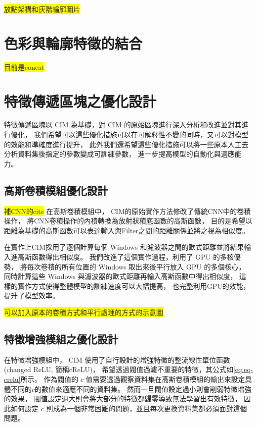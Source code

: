 \documentclass[class=NCU_thesis, crop=false]{standalone}
\begin{document}
\colorbox {yellow}{放點架構和灰階輪廓圖片}

\section{色彩與輪廓特徵的結合}
\colorbox {yellow}{目前是concat}

\section{特徵傳遞區塊之優化設計}
特徵傳遞區塊以 CIM 為基礎，對 CIM 的原始區塊進行深入分析和改進並對其進行優化，
我們希望可以這些優化措施可以在可解釋性不變的同時，又可以對模型的效能和準確度進行提升，
此外我們還希望這些優化措施可以將一些原本人工去分析資料集後指定的參數變成可訓練參數，
進一步提高模型的自動化與適應能力。

	\subsection{高斯卷積模組優化設計}

	\colorbox {yellow}{補CNN的cite}
	在高斯卷積模組中，
	CIM的原始實作方法修改了傳統CNN\cite{}中的卷積操作，
	將CNN卷積操作的內積轉換為放射狀積底函數的高斯函數，
	目的是希望以距離為基礎的高斯函數可以表達輸入與Filter之間的距離關係並將之視為相似度。

	在實作上CIM採用了逐個計算每個 Windows 和濾波器之間的歐式距離並將結果輸入進高斯函數得出相似度。
	我們改進了這個實作過程，利用了 GPU 的多核優勢，
	將每次卷積的所有位置的 Windows 取出來後平行放入 GPU 的多個核心，
	同時計算這些 Windows 與濾波器的歐式距離再輸入高斯函數中得出相似度，
	這樣的實作方式使得整體模型的訓練速度可以大幅提高，
	也完整利用GPU的效能，提升了模型效率。

	\colorbox {yellow}{可以加入原本的卷積方式和平行處理的方式的示意圖}

	\subsection{特徵增強模組之優化設計}
	在特徵增強模組中，
	CIM 使用了自行設計的增強特徵的整流線性單位函數(changed ReLU, 簡稱cReLU)，
	希望透過閥值過濾不重要的特徵，其公式如\cref{eq:eq-crelu}所示。
	作為閥值的 $c$ 值需要透過觀察資料集在高斯卷積模組的輸出來設定具體不同的$c$的數值來適應不同的資料集。
	然而一旦閥值設定過小則會削弱特徵增強的效果，
	閥值設定過大則會將大部分的特徵都歸零導致無法學習出有效特徵，
	因此如何設定 $c$ 則成為一個非常困難的問題，並且每次更換資料集都必須面對這個問題。
\end{document}
